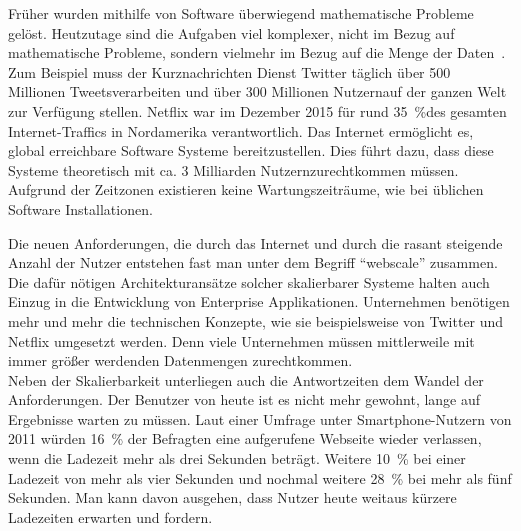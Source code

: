 Früher wurden mithilfe von Software überwiegend mathematische Probleme gelöst. Heutzutage sind die Aufgaben viel komplexer, nicht im Bezug auf mathematische Probleme, sondern vielmehr im Bezug auf die Menge der Daten~\cite[S.~18]{kuhn_reactive_2015}. Zum Beispiel muss der Kurznachrichten Dienst Twitter täglich über 500 Millionen Tweets\footnotemark[1] verarbeiten und über 300 Millionen Nutzern\footnotemark[2] auf der ganzen Welt zur Verfügung stellen. Netflix war im Dezember 2015 für rund 35~\%\footnotemark[3] des gesamten Internet-Traffics in Nordamerika verantwortlich. Das Internet ermöglicht es, global erreichbare Software Systeme bereitzustellen. Dies führt dazu, dass diese Systeme theoretisch mit ca. 3 Milliarden Nutzern\footnotemark[4] zurechtkommen müssen. Aufgrund der Zeitzonen existieren keine Wartungszeiträume, wie bei üblichen Software Installationen.


\pagebreak

Die neuen Anforderungen, die durch das Internet und durch die rasant steigende Anzahl der Nutzer entstehen fast man unter dem Begriff \enquote{\gls{webscale}} zusammen. Die dafür nötigen Architekturansätze solcher skalierbarer Systeme halten auch Einzug in die Entwicklung von Enterprise Applikationen. Unternehmen benötigen mehr und mehr die technischen Konzepte, wie sie beispielsweise von Twitter und Netflix umgesetzt werden. Denn viele Unternehmen müssen mittlerweile mit immer größer werdenden Datenmengen zurechtkommen.\\

Neben der Skalierbarkeit unterliegen auch die Antwortzeiten dem Wandel der Anforderungen. Der Benutzer von heute ist es nicht mehr gewohnt, lange auf Ergebnisse warten zu müssen. Laut einer Umfrage unter Smartphone-Nutzern von 2011 würden 16~\% der Befragten eine aufgerufene Webseite wieder verlassen, wenn die Ladezeit mehr als drei Sekunden beträgt. Weitere 10~\% bei einer Ladezeit von mehr als vier Sekunden und nochmal weitere 28~\% bei mehr als fünf Sekunden\footnotemark[5]. Man kann davon ausgehen, dass Nutzer heute weitaus kürzere Ladezeiten erwarten und fordern.\\

